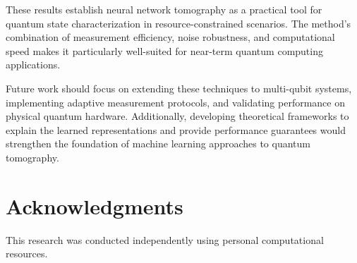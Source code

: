 \documentclass[conference]{IEEEtran}
\begin{document}
These results establish neural network tomography as a practical tool for quantum state characterization in resource-constrained scenarios. The method's combination of measurement efficiency, noise robustness, and computational speed makes it particularly well-suited for near-term quantum computing applications.

Future work should focus on extending these techniques to multi-qubit systems, implementing adaptive measurement protocols, and validating performance on physical quantum hardware. Additionally, developing theoretical frameworks to explain the learned representations and provide performance guarantees would strengthen the foundation of machine learning approaches to quantum tomography.

\section*{Acknowledgments}
   This research was conducted independently using personal computational resources.
\end{document}
